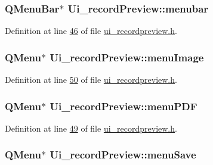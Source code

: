 \hypertarget{a00028_adddc4285028693f10dfd49cd08276e83}{
\subsubsection[{menubar}]{\setlength{\rightskip}{0pt plus 5cm}Q\+Menu\+Bar$\ast$ Ui\+\_\+record\+Preview\+::menubar}}\label{a00028_adddc4285028693f10dfd49cd08276e83}


Definition at line \hyperlink{a00053_source_l00046}{46} of file \hyperlink{a00053_source}{ui\+\_\+recordpreview.\+h}.

\hypertarget{a00028_af1ff1ecbe6ea007cfeda320cca9865b7}{
\subsubsection[{menu\+Image}]{\setlength{\rightskip}{0pt plus 5cm}Q\+Menu$\ast$ Ui\+\_\+record\+Preview\+::menu\+Image}}\label{a00028_af1ff1ecbe6ea007cfeda320cca9865b7}


Definition at line \hyperlink{a00053_source_l00050}{50} of file \hyperlink{a00053_source}{ui\+\_\+recordpreview.\+h}.

\hypertarget{a00028_a4cdb6b113583d4ef43a08b5526c13e3a}{
\subsubsection[{menu\+P\+D\+F}]{\setlength{\rightskip}{0pt plus 5cm}Q\+Menu$\ast$ Ui\+\_\+record\+Preview\+::menu\+P\+D\+F}}\label{a00028_a4cdb6b113583d4ef43a08b5526c13e3a}


Definition at line \hyperlink{a00053_source_l00049}{49} of file \hyperlink{a00053_source}{ui\+\_\+recordpreview.\+h}.

\hypertarget{a00028_a5ef77bf8c78c201d83049ee8b40cf345}{
\subsubsection[{menu\+Save}]{\setlength{\rightskip}{0pt plus 5cm}Q\+Menu$\ast$ Ui\+\_\+record\+Preview\+::menu\+Save}}\label{a00028_a5ef77bf8c78c201d83049ee8b40cf345}


